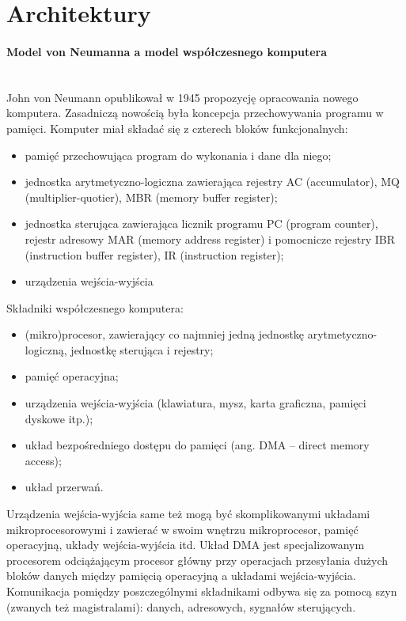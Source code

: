 \documentclass[a4paper,twoside]{report}
\begin{document}
\section{Architektury} 
 
\paragraph{Model von Neumanna a model współczesnego komputera\\\\} 
John von Neumann opublikował w 1945 propozycję opracowania nowego komputera. Zasadniczą nowością była
koncepcja przechowywania programu w pamięci. Komputer miał składać się z czterech bloków funkcjonalnych:
\begin{itemize}
\item pamięć przechowująca program do wykonania i dane dla niego;
\item jednostka arytmetyczno-logiczna zawierająca rejestry AC (accumulator), MQ (multiplier-quotier), MBR
(memory buffer register);
\item jednostka sterująca zawierająca licznik programu PC (program counter), rejestr adresowy MAR (memory
address register) i pomocnicze rejestry IBR (instruction buffer register), IR (instruction register);
\item urządzenia wejścia-wyjścia 
\end{itemize}


Składniki współczesnego komputera:
\begin{itemize}
\item (mikro)procesor, zawierający co najmniej jedną jednostkę arytmetyczno-logiczną, jednostkę sterująca i rejestry;
\item pamięć operacyjna;
\item urządzenia wejścia-wyjścia (klawiatura, mysz, karta graficzna, pamięci dyskowe itp.);
\item układ bezpośredniego dostępu do pamięci (ang. DMA – direct memory access);
\item układ przerwań.
\end{itemize}

Urządzenia wejścia-wyjścia same też mogą być skomplikowanymi układami mikroprocesorowymi i zawierać w swoim
wnętrzu mikroprocesor, pamięć operacyjną, układy wejścia-wyjścia itd. Układ DMA jest specjalizowanym procesorem odciążającym procesor główny przy operacjach przesyłania dużych bloków danych między pamięcią operacyjną a układami wejścia-wyjścia. Komunikacja pomiędzy poszczególnymi składnikami odbywa się za
pomocą szyn (zwanych też magistralami): danych, adresowych, sygnałów sterujących.
\end{document}
